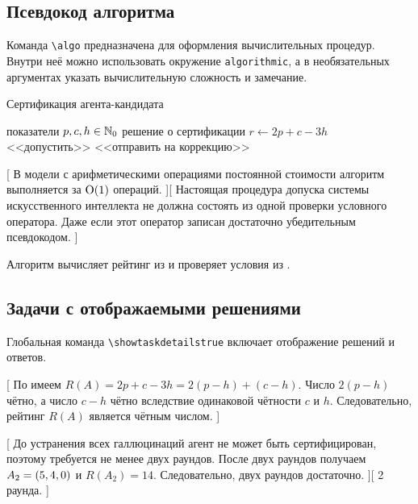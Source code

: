 \subsection{Псевдокод алгоритма}

Команда \verb|\algo| предназначена для оформления вычислительных процедур.
Внутри неё можно использовать окружение \verb|algorithmic|, а в необязательных аргументах указать вычислительную сложность и замечание.

{Сертификация агента-кандидата}{
    \begin{algorithmic}[1]
        \Require показатели $p, c, h \in \mathbb{N}_0$
        \Ensure решение о сертификации
        \State $r \gets 2p + c - 3h$
            \State \Return <<допустить>>
        \Else
            \State \Return <<отправить на коррекцию>>
        \EndIf
    \end{algorithmic}
}[
    В модели с арифметическими операциями постоянной стоимости алгоритм выполняется за $\operatorname{O}\mathopen{}\left(1\right)\mathclose{}$ операций.
][
    Настоящая процедура допуска системы искусственного интеллекта не должна состоять из одной проверки условного оператора.
    Даже если этот оператор записан достаточно убедительным псевдокодом.
]

Алгоритм вычисляет рейтинг из  и проверяет условия из .


\subsection{Задачи с отображаемыми решениями}

Глобальная команда \verb|\showtaskdetailstrue| включает отображение решений и ответов.

\showtaskdetailstrue

[
    По  имеем $R(A) = 2p + c - 3h = 2(p - h) + (c - h)$.
    Число $2(p - h)$ чётно, а число $c - h$ чётно вследствие одинаковой чётности $c$ и $h$.
    Следовательно, рейтинг $R(A)$ является чётным числом.
]

[
    До устранения всех галлюцинаций агент не может быть сертифицирован, поэтому требуется не менее двух раундов.
    После двух раундов получаем $A_2 = \left(5, 4, 0\right)$ и $R(A_2) = 14$.
    Следовательно, двух раундов достаточно.
][
    2 раунда.
]

